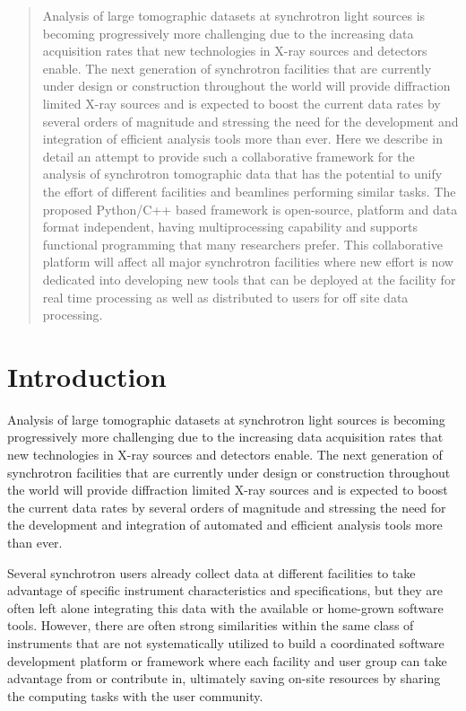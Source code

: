 \documentclass[pdf]{iucr}              %
\begin{document}
\begin{abstract}
Analysis of large tomographic datasets at synchrotron light sources is becoming progressively more challenging due to the increasing data acquisition rates that new technologies in X-ray sources and detectors enable. The next generation of synchrotron facilities that are currently under design or construction throughout the world will provide diffraction limited X-ray sources and is expected to boost the current data rates by several orders of magnitude and stressing the need for the development and integration of efficient analysis tools more than ever. Here we describe in detail an attempt to provide such a collaborative framework for the analysis of synchrotron tomographic data that has the potential to unify the effort of different facilities and beamlines performing similar tasks. The proposed Python/C++ based framework is open-source, platform and data format independent,  having multiprocessing capability and supports functional programming that many researchers prefer. This collaborative platform will affect all major synchrotron facilities where new effort is now dedicated into developing new tools that can be deployed at the facility for real time processing as well as distributed to users for off site data processing.
\end{abstract}


\section{Introduction}

Analysis of large tomographic datasets at synchrotron light sources is becoming progressively more challenging  due to the increasing data acquisition rates that new technologies in X-ray sources and detectors enable. The next generation of synchrotron facilities that are currently under design or construction throughout the world will provide diffraction limited X-ray sources and is expected to boost the current data rates by several orders of magnitude and stressing the need for the development and integration of automated and efficient analysis tools more than ever. 

Several synchrotron users already collect data at different facilities to take advantage of specific instrument characteristics and specifications, but they are often left alone integrating this data with the available or home-grown software tools. However, there are often strong similarities within the same class of instruments that are not systematically utilized to build a coordinated software development platform or framework where each facility and user group can take advantage from or contribute in, ultimately saving on-site resources by sharing the computing tasks with the user community. 
\end{document}
